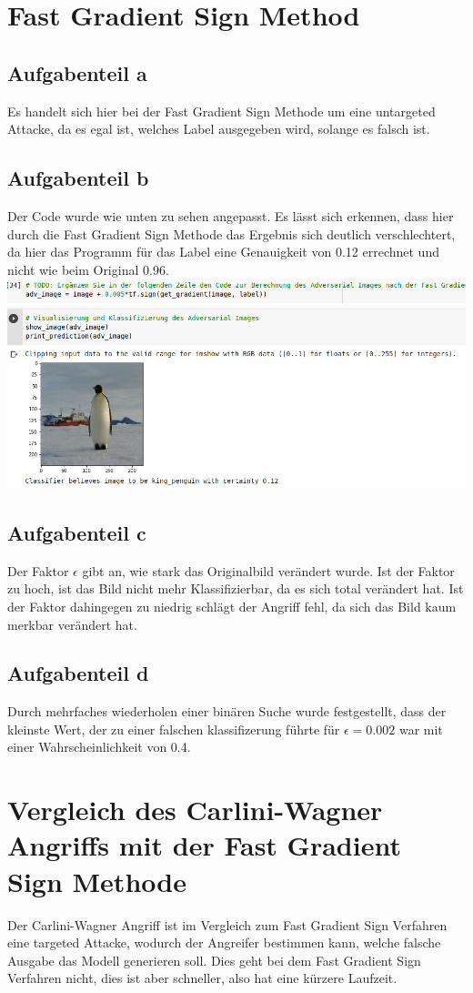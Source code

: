 \documentclass[a4paper,12pt,
headsepline,           %
twoside,               %
pointlessnumbers,      %
bibtotoc,              %
BCOR15mm               %
]{scrbook}
\begin{document}
\section*{Fast Gradient Sign Method}

\subsection*{Aufgabenteil a}
Es handelt sich hier bei der Fast Gradient Sign Methode um eine untargeted Attacke, da es egal ist, welches Label ausgegeben wird, solange es falsch ist.

\subsection*{Aufgabenteil b}
Der Code wurde wie unten zu sehen angepasst. Es lässt sich erkennen, dass hier durch die Fast Gradient Sign Methode das Ergebnis sich deutlich verschlechtert, da hier
das Programm für das Label eine Genauigkeit von 0.12 errechnet und nicht wie beim Original 0.96.
\includegraphics[scale=0.5]{Task4-3_2.png}
\subsection*{Aufgabenteil c}
Der Faktor $\epsilon$ gibt an, wie stark das Originalbild verändert wurde. Ist der Faktor zu hoch, ist das Bild nicht mehr Klassifizierbar, da es sich total verändert hat. Ist der Faktor dahingegen zu niedrig schlägt der Angriff fehl, da sich das Bild kaum merkbar verändert hat.

\subsection*{Aufgabenteil d}
Durch mehrfaches wiederholen einer binären Suche wurde festgestellt, dass der kleinste Wert, der zu einer falschen klassifizerung führte für $\epsilon = 0.002$ war mit einer Wahrscheinlichkeit von 0.4. 

\section*{Vergleich des Carlini-Wagner Angriffs mit der Fast Gradient Sign Methode}
Der Carlini-Wagner Angriff ist im Vergleich zum Fast Gradient Sign Verfahren eine targeted Attacke, wodurch der 
Angreifer bestimmen kann, welche falsche Ausgabe das Modell generieren soll. Dies geht bei dem Fast Gradient Sign Verfahren nicht, dies ist aber schneller, also hat eine kürzere Laufzeit.
\end{document}
